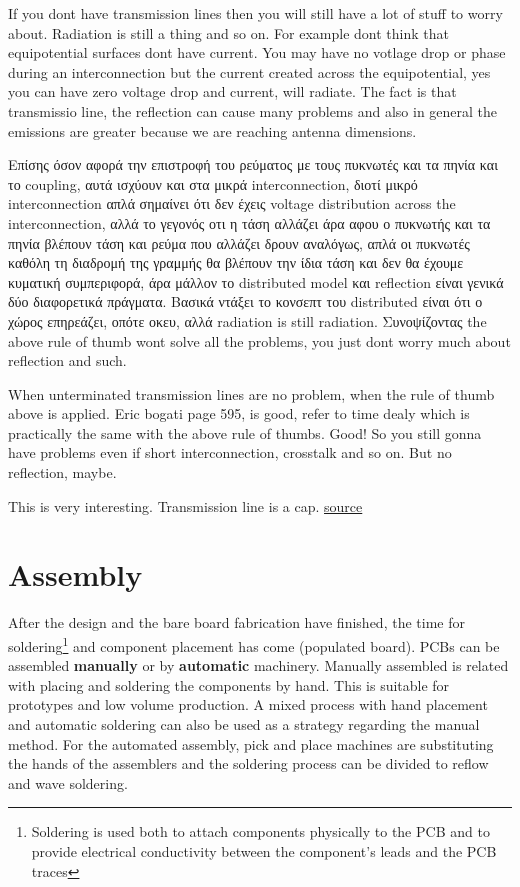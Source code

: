 \documentclass[12pt]{article}
\begin{document}
If you dont have transmission lines then you will still have a lot of stuff to worry about. Radiation is still a thing and so on. For example dont think that equipotential surfaces dont have current. You may have no votlage drop or phase during an interconnection but the current created across the equipotential, yes you can have zero voltage drop and current, will radiate. The fact is that transmissio line, the reflection can cause many problems and also in general the emissions are greater because we are reaching antenna dimensions.

Επίσης όσον αφορά την επιστροφή του ρεύματος με τους πυκνωτές και τα πηνία και το coupling, αυτά ισχύουν και στα μικρά interconnection, διοτί μικρό interconnection απλά σημαίνει ότι δεν έχεις voltage distribution across the interconnection, αλλά το γεγονός οτι η τάση αλλάζει άρα αφου ο πυκνωτής και τα πηνία βλέπουν τάση και ρεύμα που αλλάζει δρουν αναλόγως, απλά οι πυκνωτές καθόλη τη διαδρομή της γραμμής θα βλέπουν την ίδια τάση και δεν θα έχουμε κυματική συμπεριφορά, άρα μάλλον το distributed model και reflection είναι γενικά δύο διαφορετικά πράγματα. Βασικά ντάξει το κονσεπτ του distributed είναι ότι ο χώρος επηρεάζει, οπότε οκευ, αλλά radiation is still radiation. Συνοψίζοντας the above rule of thumb wont solve all the problems, you just dont worry much about reflection and such.

When unterminated transmission lines are no problem, when the rule of thumb above is applied. Eric bogati page 595, is good, refer to time dealy which is practically the same with the above rule of thumbs. Good! So you still gonna have problems even if short interconnection, crosstalk and so on. But no reflection, maybe.

This is very interesting. Transmission line is a cap. \href{https://www.polarinstruments.com/support/cits/Critical_length.pdf}{source}

\section{Assembly}

After the design and the bare board fabrication have finished, the time for soldering\footnote{Soldering is used both to attach components physically to the PCB and to provide electrical conductivity between the component’s leads and the PCB traces} and component placement has come (populated board). PCBs can be assembled \textbf{manually} or by \textbf{automatic} machinery. Manually assembled is related with placing and soldering the components by hand. This is suitable for prototypes and low volume production. A mixed process with hand placement and automatic soldering can also be used as a strategy regarding the manual method. For the automated assembly, pick and place machines are substituting the hands of the assemblers and the soldering process can be divided to reflow and wave soldering. 
\end{document}
